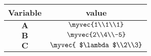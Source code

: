 \begin{tabular}[12pt]{ |c| c|}
    \hline
    \textbf{Variable} & \textbf{value}\\ 
    \hline
    $\mathbf{A}$ & $\myvec{1\\1\\1}$\\
    \hline
    $\mathbf{B}$ & $\myvec{2\\4\\-5}$\\
    \hline
    $\mathbf{C}$ & $\myvec{ $\lambda$\\2\\3}$\\
    \hline
    \end{tabular}
